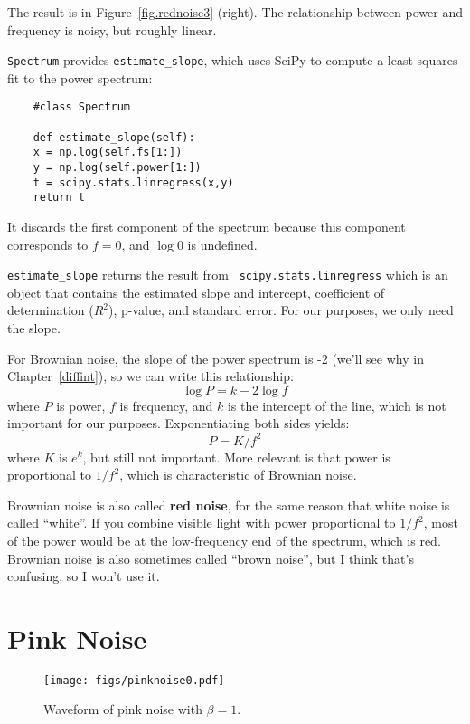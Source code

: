 The result is in Figure~\ref{fig.rednoise3} (right).  The relationship between
power and frequency is noisy, but roughly linear.

{\tt Spectrum} provides \verb"estimate_slope", which uses SciPy to compute
a least squares fit to the power spectrum:

\begin{verbatim}
	#class Spectrum
	
	def estimate_slope(self):
	x = np.log(self.fs[1:])
	y = np.log(self.power[1:])
	t = scipy.stats.linregress(x,y)
	return t
\end{verbatim}

It discards the first component of the spectrum because
this component corresponds to $f=0$, and $\log 0$ is undefined.

\verb"estimate_slope" returns the result from {\tt
	scipy.stats.linregress} which is an object that contains the
estimated slope and intercept, coefficient of determination ($R^2$),
p-value, and standard error.  For our purposes, we only need the
slope.

For Brownian noise, the slope of the power spectrum is -2 (we'll see
why in Chapter~\ref{diffint}), so we can write this relationship:
%
\[ \log P = k -2 \log f \]
%
where $P$ is power, $f$ is frequency, and $k$ is the intercept
of the line, which is not important for our purposes.
Exponentiating both sides yields:
%
\[ P = K / f^{2} \]
%
where $K$ is $e^k$, but still not important.  More relevant is
that power is proportional to $1/f^2$, which is characteristic
of Brownian noise.

Brownian noise is also called {\bf red noise}, for the same reason that
white noise is called ``white''.  If you combine visible light with
power proportional to $1/f^2$, most of the power
would be at the low-frequency end of the spectrum, which is red.
Brownian noise is also sometimes called ``brown noise'', but I think
that's confusing, so I won't use it.



\section{Pink Noise}
\label{pink}

\begin{figure}
	\centerline{\texttt{[image: figs/pinknoise0.pdf]}}
	\caption{Waveform of pink noise with $\beta=1$.}
	\label{fig.pinknoise0}
\end{figure}

